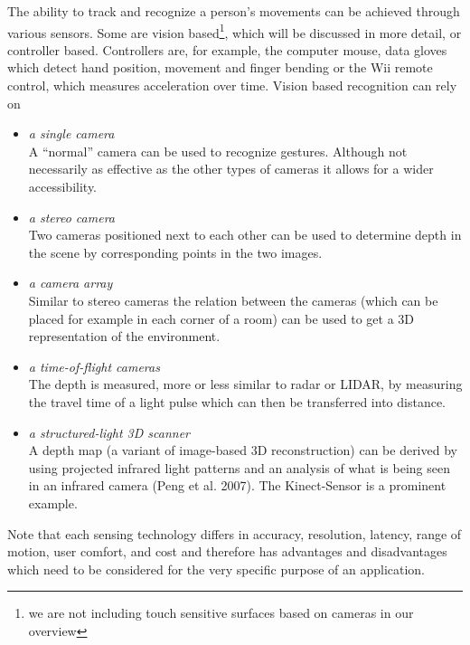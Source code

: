 \documentclass[titlepage,12pt,a4paper]{article}
\begin{document}
The ability to track and recognize a person's movements can be achieved through various sensors. Some are vision based\footnote{we are not including touch sensitive surfaces based on cameras in our overview}, which will be discussed in more detail, or controller based. Controllers are, for example, the computer mouse, data gloves which detect hand position, movement and finger bending or the Wii remote control, which measures acceleration over time. Vision based recognition can rely on 
\begin{itemize}
	\item \emph{a single camera}\\ A “normal” camera can be used to recognize gestures. Although not necessarily as effective as the other types of cameras it allows for a wider accessibility.
	\item \emph{a stereo camera}\\ Two cameras positioned next to each other can be used to determine depth in the scene by corresponding points in the two images. 
	\item \emph{a camera array}\\ Similar to stereo cameras the relation between the cameras (which can be placed for example in each corner of a room) can be used to get a 3D representation of the environment.
	\item \emph{a time-of-flight cameras}\\ The depth is measured, more or less similar to radar or LIDAR, by measuring the travel time of a light pulse which can then be transferred into distance. 
	\item \emph{a structured-light 3D scanner}\\ A depth map (a variant of image-based 3D reconstruction) can be derived by using projected infrared light patterns and an analysis of what is being seen in an infrared camera (Peng et al. 2007). The Kinect-Sensor is a prominent example.
\end{itemize}
Note that each sensing technology differs in accuracy, resolution, latency, range of motion, user comfort, and cost and therefore has advantages and disadvantages which need to be considered for the very specific purpose of an application.
\end{document}
